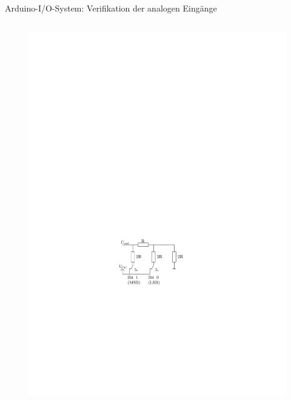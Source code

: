 \documentclass{beamer}
\begin{document}
\begin{frame}{Arduino-I/O-System: Verifikation der analogen Eing\"ange}
\begin{columns}
\begin{column}{0.4\textwidth}
			\begin{figure}[htbp]
				\centering
				\includegraphics[scale=0.6]{./images/arduinoio-r2r-network.pdf}
			\end{figure}
		\end{column}
	\end{columns}
\end{frame}
\end{document}
